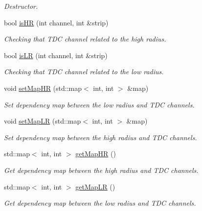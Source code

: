 \begin{DoxyCompactItemize}
\begin{DoxyCompactList}\small\item\em Destructor. \end{DoxyCompactList}\item 
bool \hyperlink{classiRPCInfo_aa5dd5259557be3ea2e5763cf25d1a1c1}{is\-H\-R} (int channel, int \&strip)
\begin{DoxyCompactList}\small\item\em Checking that T\-D\-C channel related to the high radius. \end{DoxyCompactList}\item 
bool \hyperlink{classiRPCInfo_adecf8620f55445dd1d4c5bc8c2039fc8}{is\-L\-R} (int channel, int \&strip)
\begin{DoxyCompactList}\small\item\em Checking that T\-D\-C channel related to the low radius. \end{DoxyCompactList}\item 
void \hyperlink{classiRPCInfo_a0c236d13b7a79a88ed17562d4c7ab4de}{set\-Map\-H\-R} (std\-::map$<$ int, int $>$ \&map)
\begin{DoxyCompactList}\small\item\em Set dependency map between the low radius and T\-D\-C channels. \end{DoxyCompactList}\item 
void \hyperlink{classiRPCInfo_a2940b84c1d0c1be711384e659a7f8605}{set\-Map\-L\-R} (std\-::map$<$ int, int $>$ \&map)
\begin{DoxyCompactList}\small\item\em Set dependency map between the high radius and T\-D\-C channels. \end{DoxyCompactList}\item 
std\-::map$<$ int, int $>$ \hyperlink{classiRPCInfo_a0195423682d796ed18c62a1f5ba01da2}{get\-Map\-H\-R} ()
\begin{DoxyCompactList}\small\item\em Get dependency map between the high radius and T\-D\-C channels. \end{DoxyCompactList}\item 
std\-::map$<$ int, int $>$ \hyperlink{classiRPCInfo_a46507104cb86d1508302d5ba1ba0b57c}{get\-Map\-L\-R} ()
\begin{DoxyCompactList}\small\item\em Get dependency map between the low radius and T\-D\-C channels. \end{DoxyCompactList}\item 

\end{DoxyCompactItemize}

